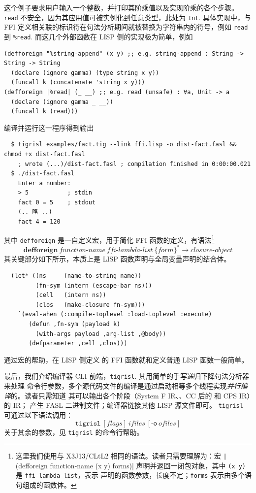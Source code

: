 \documentclass[a4paper, 11pt]{article}
\theoremstyle{remark}\newtheorem*{remark}{Remark}
\theoremstyle{definition}\newtheorem*{definition}{Definition}
\begin{document}
这个例子要求用户输入一个整数，并打印其阶乘值以及实现阶乘的各个步骤。
\texttt{read} 不安全，因为其应用值可被实例化到任意类型，此处为 \texttt{Int}.
具体实现中，与 FFI 定义相关联的标识符在句法分析期间就被替换为字符串内的符号，例如
\texttt{read} 到 \texttt{\%read}. 而这几个外部函数在 LISP 侧的实现极为简单，例如
\begin{verbatim}
(defforeign "%string-append" (x y) ;; e.g. string-append : String -> String -> String
  (declare (ignore gamma) (type string x y))
  (funcall k (concatenate 'string x y)))
(defforeign |%read| (_ __) ;; e.g. read (unsafe) : ∀a, Unit -> a
  (declare (ignore gamma _ __))
  (funcall k (read)))
\end{verbatim}
编译并运行这一程序得到输出
\begin{Verbatim}
  $ tigrisl examples/fact.tig --link ffi.lisp -o dist-fact.fasl && chmod +x dist-fact.fasl
    ; wrote (...)/dist-fact.fasl ; compilation finished in 0:00:00.021
  $ ./dist-fact.fasl
    Enter a number:
    > 5           ; stdin
    fact 0 = 5    ; stdout
    (.. 略 ..)
    fact 4 = 120
\end{Verbatim}
其中 \texttt{defforeign} 是一自定义宏，用于简化 FFI 函数的定义，有语法\footnote{
  这里我们使用与 X3J13/CLtL2 相同的语法。读者只需要理解为：宏 \texttt|(defforeign function-name (x y) forms)|
  声明并返回一闭包对象，其中 \texttt{(x y)} 是 \texttt{ffi-lambda-list}，表示
  声明的函数参数，长度不定；\texttt{forms} 表示由多个语句组成的函数体。
}
\[
  \mathbf{defforeign}\ \textit{function-name}\ \textit{ffi-lambda-list}\ \{\textit{form}\}^*\longrightarrow \textit{closure-object}
\]
其关键部分如下所示，本质上是 LISP 函数声明与全局变量声明的结合体。
\begin{verbatim}
  (let* ((ns     (name-to-string name))
         (fn-sym (intern (escape-bar ns)))
         (cell   (intern ns))
         (clos   (make-closure fn-sym)))
    `(eval-when (:compile-toplevel :load-toplevel :execute)
       (defun ,fn-sym (payload k)
         (with-args payload ,arg-list ,@body))
       (defparameter ,cell ,clos)))
\end{verbatim}
通过宏的帮助，在 LISP 侧定义 \Tigris 的 FFI 函数就和定义普通 LISP 函数一般简单。

最后，我们介绍编译器 CLI 前端，\texttt{tigrisl}. 其用简单的手写递归下降句法分析器来处理
命令行参数，多个源代码文件的编译是通过启动相等多个线程实现\emph{并行编译}的。读者只需知道
其可以输出各个阶段（System F IR、\Lambdair、CC 后的 \Lambdair 和 CPS IR）的 IR；
产生 FASL 二进制文件；编译器链接其他 LISP 源文件即可。
\texttt{tigrisl} 可通过以下语法调用：
\[
  \texttt{tigrisl}\ [\textit{flags}]\ \textit{ifiles}\ [\textsf{-o}\ \textit{ofiles}]
\]
关于其余的参数，见 \texttt{tigrisl} 的命令行帮助。
\end{document}
